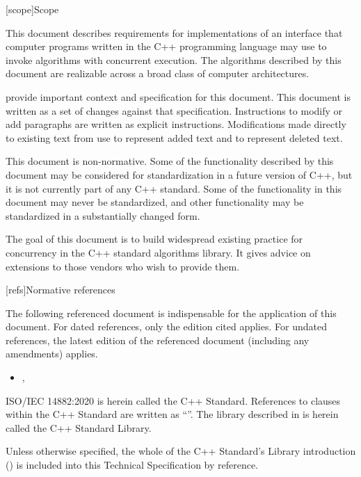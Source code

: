 
[scope]{Scope}

\pnum
This document describes requirements for implementations of an interface that computer programs written in the C++ programming language may use to invoke algorithms with concurrent execution. The algorithms described by this document are realizable across a broad class of computer architectures.

\pnum
{\cppstddocno} provide important context and specification for
this document. This document is written as a set of changes against that specification.  Instructions to modify or add paragraphs are written as
explicit instructions.  Modifications made directly to existing text from {\cppstddocno} use  to represent added text and  to represent deleted text.

\pnum
This document is non-normative. Some of the functionality described by this document may be considered for standardization in a future version of C++, but it is not currently part of any C++ standard. Some of the functionality in this document may never be standardized, and other functionality may be standardized in a substantially changed form.

\pnum
The goal of this document is to build widespread existing practice for concurrency in the C++ standard algorithms library. It gives advice on extensions to those vendors who wish to provide them.

[refs]{Normative references}

\pnum
The following referenced document is indispensable for the application of this document. For dated references, only the edition cited applies. For undated references, the latest edition of the referenced document (including any amendments) applies.

\begin{itemize}
\item {\cppstddocno}, 
\end{itemize}

\pnum
ISO/IEC 14882:2020 is herein called the C++ Standard. References to clauses within the C++ Standard are written as ``''. The library described in  is herein called the C++ Standard Library.

\pnum
Unless otherwise specified, the whole of the C++ Standard's Library introduction () is included into this Technical Specification by reference.

